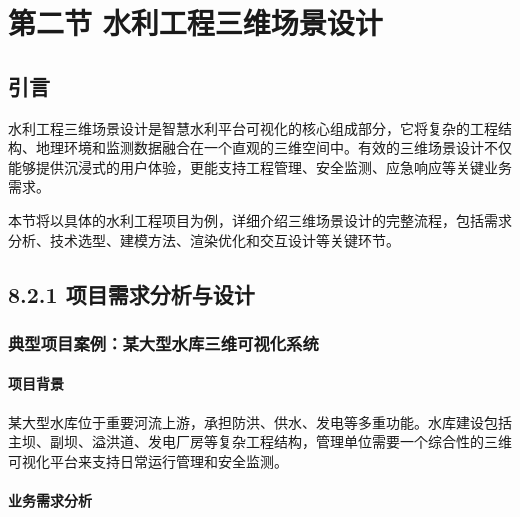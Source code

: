 \section{第二节
水利工程三维场景设计}\label{ux7b2cux4e8cux8282-ux6c34ux5229ux5de5ux7a0bux4e09ux7ef4ux573aux666fux8bbeux8ba1}

\subsection{引言}\label{ux5f15ux8a00}

水利工程三维场景设计是智慧水利平台可视化的核心组成部分，它将复杂的工程结构、地理环境和监测数据融合在一个直观的三维空间中。有效的三维场景设计不仅能够提供沉浸式的用户体验，更能支持工程管理、安全监测、应急响应等关键业务需求。

本节将以具体的水利工程项目为例，详细介绍三维场景设计的完整流程，包括需求分析、技术选型、建模方法、渲染优化和交互设计等关键环节。

\subsection{8.2.1
项目需求分析与设计}\label{ux9879ux76eeux9700ux6c42ux5206ux6790ux4e0eux8bbeux8ba1}

\subsubsection{典型项目案例：某大型水库三维可视化系统}\label{ux5178ux578bux9879ux76eeux6848ux4f8bux67d0ux5927ux578bux6c34ux5e93ux4e09ux7ef4ux53efux89c6ux5316ux7cfbux7edf}

\paragraph{项目背景}\label{ux9879ux76eeux80ccux666f}

某大型水库位于重要河流上游，承担防洪、供水、发电等多重功能。水库建设包括主坝、副坝、溢洪道、发电厂房等复杂工程结构，管理单位需要一个综合性的三维可视化平台来支持日常运行管理和安全监测。

\paragraph{业务需求分析}\label{ux4e1aux52a1ux9700ux6c42ux5206ux6790}


